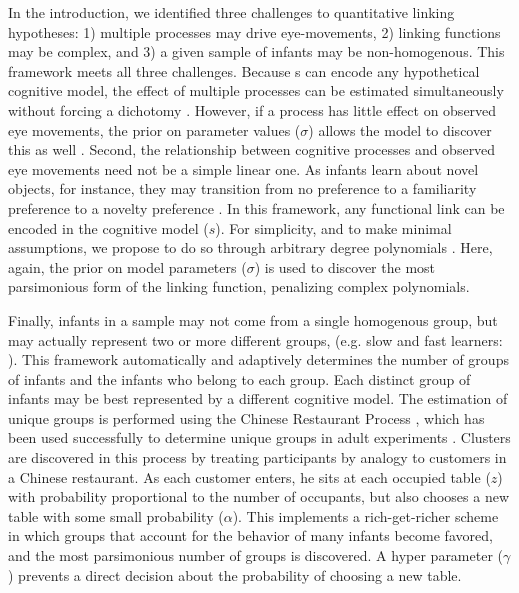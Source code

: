 \documentclass[12pt]{article}
\begin{document}
	In the introduction, we identified three challenges to quantitative linking hypotheses: 1) multiple processes may drive eye-movements, 2) linking functions may be complex, and 3) a given sample of infants may be non-homogenous. This framework meets all three challenges. Because s can encode any hypothetical cognitive model, the effect of multiple processes can be estimated simultaneously without forcing a dichotomy \cite{Newell1973, Anderson2011}.  However, if a process has little effect on observed eye movements, the prior on parameter values ($\sigma$) allows the model to discover this as well \cite{Figuerido2002}. Second, the relationship between cognitive processes and observed eye movements need not be a simple linear one. As infants learn about novel objects, for instance, they may transition from no preference to a familiarity preference to a novelty preference \cite{Hunter1988, Cohen2004}. In this framework, any functional link can be encoded in the cognitive model ($s$). For simplicity, and to make minimal assumptions, we propose to do so through arbitrary degree polynomials \cite{Barr2008, Jackson2009}. Here, again, the prior on model parameters ($\sigma$) is used to discover the most parsimonious form of the linking function, penalizing complex polynomials.

	Finally, infants in a sample may not come from a single homogenous group, but may actually represent two or more different groups, (e.g. slow and fast learners: \cite{Cashon2000, Schoner2006, Yu2011a}). This framework automatically and adaptively determines the number of groups of infants and the infants who belong to each group. Each distinct group of infants may be best represented by a different cognitive model. The estimation of unique groups is performed using the Chinese Restaurant Process \cite{Aldous1985, Rasmussen2000}, which has been used successfully to determine unique groups in adult experiments \cite{Navarro2006}. Clusters are discovered in this process by treating participants by analogy to customers in a Chinese restaurant. As each customer enters, he sits at each occupied table ($z$) with probability proportional to the number of occupants, but also chooses a new table with some small probability ($\alpha$). This implements a rich-get-richer scheme in which groups that account for the behavior of many infants become favored, and the most parsimonious number of groups is discovered. A hyper parameter ($\gamma$) prevents a direct decision about the probability of choosing a new table.
\end{document}
